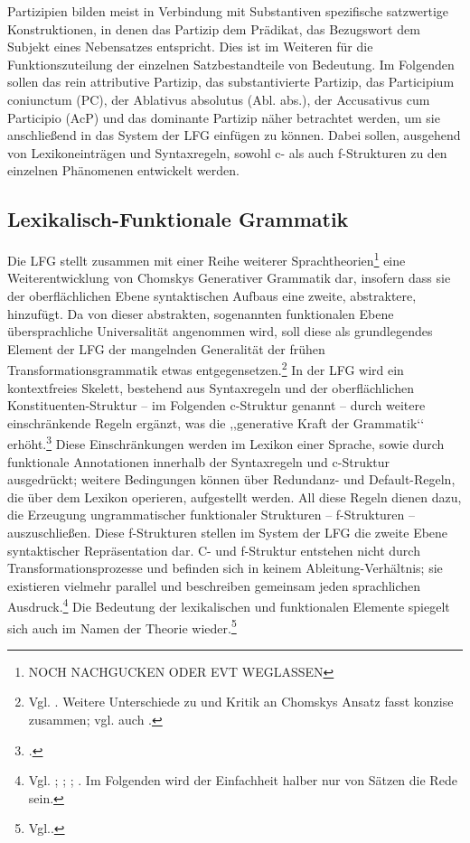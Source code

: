 \documentclass[12pt,a4paper]{article}
\begin{document}
Partizipien bilden meist in Verbindung mit Substantiven spezifische satzwertige Konstruktionen, in denen das Partizip dem Prädikat, das Bezugswort dem Subjekt eines Nebensatzes entspricht. Dies ist im Weiteren für die Funktionszuteilung der einzelnen Satzbestandteile von Bedeutung.
Im Folgenden sollen das rein attributive Partizip, das substantivierte Partizip, das Participium coniunctum (PC), der Ablativus absolutus (Abl. abs.), der Accusativus cum Participio (AcP) und das dominante Partizip näher betrachtet werden, um sie anschließend in das System der LFG einfügen zu können. Dabei sollen, ausgehend von Lexikoneinträgen und Syntaxregeln, sowohl c- als auch f-Strukturen zu den einzelnen Phänomenen entwickelt werden.
\subsection{Lexikalisch-Funktionale Grammatik}
Die LFG stellt zusammen mit einer Reihe weiterer Sprachtheorien\footnote{NOCH NACHGUCKEN ODER EVT WEGLASSEN} eine Weiterentwicklung von Chomskys Generativer Grammatik dar, insofern dass sie der oberflächlichen Ebene syntaktischen Aufbaus eine zweite, abstraktere, hinzufügt. Da von dieser abstrakten, sogenannten funktionalen Ebene übersprachliche Universalität angenommen wird, soll diese als grundlegendes Element der LFG der mangelnden Generalität der frühen Transformationsgrammatik etwas entgegensetzen.\footnote{Vgl. \cite[1-3; 9]{Dal}. Weitere Unterschiede zu und Kritik an Chomskys Ansatz fasst \cite[11]{Rohrer} konzise zusammen; vgl. auch \cite[1; 3]{Dal}.} In der LFG wird ein kontextfreies Skelett, bestehend aus Syntaxregeln und der oberflächlichen Konstituenten-Struktur – im Folgenden c-Struktur genannt --  durch weitere einschränkende Regeln ergänzt, was die ,,generative Kraft der Grammatik‘‘ erhöht.\footnote{\cite[9]{Rohrer}.} Diese Einschränkungen werden im Lexikon einer Sprache, sowie durch funktionale Annotationen innerhalb der Syntaxregeln und c-Struktur ausgedrückt; weitere Bedingungen können über Redundanz- und Default-Regeln, die über dem Lexikon operieren, aufgestellt werden. 
All diese Regeln dienen dazu, die Erzeugung ungrammatischer funktionaler Strukturen -- f-Strukturen -- auszuschließen. Diese f-Strukturen stellen im System der LFG die zweite Ebene syntaktischer Repräsentation dar. C- und f-Struktur entstehen nicht durch Transformationsprozesse und befinden sich in keinem Ableitung-Verhältnis; sie existieren vielmehr parallel und beschreiben gemeinsam jeden sprachlichen Ausdruck.\footnote{Vgl. \cite[64]{Falk}; \cite[8]{Skript}; \cite[2; 4; 7]{Dal}; \cite[11; 13]{Rohrer}. Im Folgenden wird der Einfachheit halber nur von Sätzen die Rede sein.} Die Bedeutung der lexikalischen und funktionalen Elemente spiegelt sich auch im Namen der Theorie wieder.\footnote{Vgl.\cite[3]{Dal}.}
\end{document}
